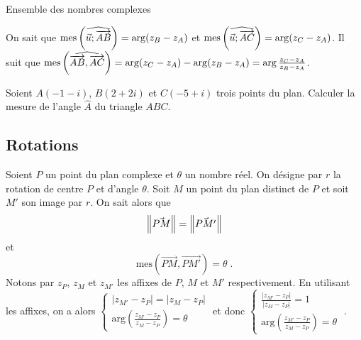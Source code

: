 \begin{chapter}{Ensemble des nombres complexes}
\begin{figure}[h!]
		\end{figure}
%
      On sait que $\mathrm{mes}\left( \widehat{ \vec{u} ; \overrightarrow{AB} } \right) = \arg(z_B - z_A)$ et 
      $\mathrm{mes}\left( \widehat{ \vec{u} ; \overrightarrow{AC} } \right) = \arg(z_C - z_A)$.
      Il suit que 
      $\mathrm{mes}\left( \widehat{ \overrightarrow{AB} , \overrightarrow{AC} } \right) = \arg(z_C-z_A)-\arg(z_B-z_A)=\arg\frac{z_C - z_A}{z_B - z_A}$.
\begin{exe}
Soient $A (-1 - i)$, $B (2 + 2 i)$ et $C (-5 + i ) $ trois points du plan.
Calculer la mesure de l'angle $\hat{A}$ du triangle $ABC$.
\end{exe}
%
\subsection{Rotations}
%
%
Soient $P$ un point du plan complexe et $\theta$ un nombre r\'eel.
On d\'esigne par $r$ la rotation de centre $P$ et d'angle $\theta$.
Soit $M$ un point du plan distinct de $P$ et soit $M'$ son image par $r$.
On sait alors que 
\begin{equation}
\left\lVert \vec{PM}\right\rVert = \left\lVert \vec{PM'}\right\rVert 
\label{eq:1}
\end{equation}
et 
\begin{equation}
\mathrm{mes}\left(\overrightarrow{PM} , \overrightarrow{PM'} \right) = \theta \; .
\label{eq:2}
\end{equation}
Notons par $z_P$, $z_M$ et $z_{M'}$ les affixes de $P$, $M$ et $M'$ respectivement.
En utilisant les affixes, on a alors 
$
\left\lbrace
\begin{matrix}
| z_{M'} - z_P | = | z_M - z_P | \\
\text{arg} \left( \frac{z_{M'} - z_P}{z_M - z_P } \right) = \theta
\end{matrix}
\right.
$
et donc 
$
\left\lbrace
\begin{matrix}
\frac{| z_{M'} - z_P |}{| z_M - z_P |} = 1 \\
\text{arg} \left( \frac{z_{M'} - z_P}{z_M - z_P } \right) = \theta
\end{matrix}
\right.
$
. 


\end{chapter}
